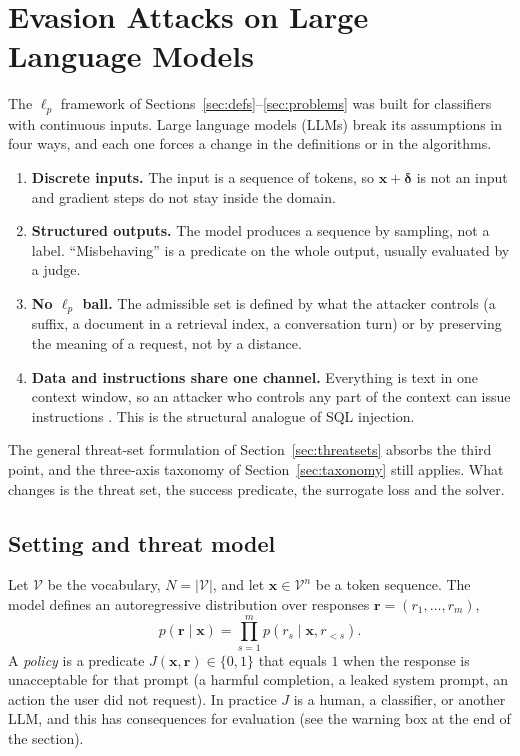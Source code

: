 \documentclass[10pt,a4paper]{extarticle}
\theoremstyle{definition}
\newcommand{\x}{\mathbf{x}}
\newcommand{\bdelta}{\boldsymbol{\delta}}
\begin{document}
\section{Evasion Attacks on Large Language Models}\label{sec:llm}

The \(\ell_p\) framework of Sections~\ref{sec:defs}--\ref{sec:problems} was built for classifiers with continuous inputs. Large language models (LLMs) break its assumptions in four ways, and each one forces a change in the definitions or in the algorithms.
\begin{enumerate}
  \item \textbf{Discrete inputs.} The input is a sequence of tokens, so \(\x+\bdelta\) is not an input and gradient steps do not stay inside the domain.
  \item \textbf{Structured outputs.} The model produces a sequence by sampling, not a label. \enquote{Misbehaving} is a predicate on the whole output, usually evaluated by a judge.
  \item \textbf{No \(\ell_p\) ball.} The admissible set is defined by what the attacker controls (a suffix, a document in a retrieval index, a conversation turn) or by preserving the meaning of a request, not by a distance.
  \item \textbf{Data and instructions share one channel.} Everything is text in one context window, so an attacker who controls any part of the context can issue instructions \citep{nist2025ai1002}. This is the structural analogue of SQL injection.
\end{enumerate}
The general threat-set formulation of Section~\ref{sec:threatsets} absorbs the third point, and the three-axis taxonomy of Section~\ref{sec:taxonomy} still applies. What changes is the threat set, the success predicate, the surrogate loss and the solver.

\subsection{Setting and threat model}

Let \(\mathcal{V}\) be the vocabulary, \(N=|\mathcal{V}|\), and let \(\x\in\mathcal{V}^n\) be a token sequence. The model defines an autoregressive distribution over responses \(\mathbf{r}=(r_1,\dots,r_m)\),
\[
p(\mathbf{r}\mid\x)=\prod_{s=1}^{m}p(r_s\mid\x,r_{<s}).
\]
A \emph{policy} is a predicate \(J(\x,\mathbf{r})\in\{0,1\}\) that equals \(1\) when the response is unacceptable for that prompt (a harmful completion, a leaked system prompt, an action the user did not request). In practice \(J\) is a human, a classifier, or another LLM, and this has consequences for evaluation (see the warning box at the end of the section).
\end{document}
